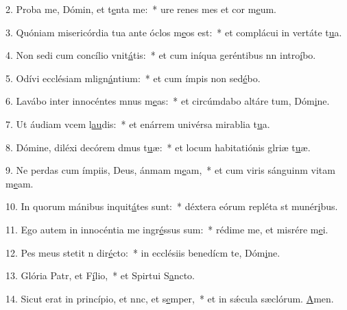 2. Proba me, Dómin, et t\uline{e}nta me:~* ure renes mes et cor m\uline{e}um.\par 
3. Quóniam misericórdia tua ante óclos m\uline{e}os est:~* et complácui in vertáte t\uline{u}a.\par 
4. Non sedi cum concílio vnit\uline{á}tis:~* et cum iníqua geréntibus nn intro\uline{í}bo.\par 
5. Odívi ecclésiam mlign\uline{á}ntium:~* et cum ímpis non sed\uline{é}bo.\par 
6. Lavábo inter innocéntes mnus m\uline{e}as:~* et circúmdabo altáre tum, Dóm\uline{i}ne.\par 
7. Ut áudiam vcem l\uline{au}dis:~* et enárrem univérsa mirablia t\uline{u}a.\par 
8. Dómine, diléxi decórem dmus t\uline{u}æ:~* et locum habitatiónis glriæ t\uline{u}æ.\par 
9. Ne perdas cum ímpiis, Deus, ánmam m\uline{e}am,~* et cum viris sánguinm vitam m\uline{e}am.\par 
10. In quorum mánibus inquit\uline{á}tes sunt:~* déxtera eórum repléta st munér\uline{i}bus.\par 
11. Ego autem in innocéntia me ingr\uline{é}ssus sum:~* rédime me, et misrére m\uline{e}i.\par 
12. Pes meus stetit n dir\uline{é}cto:~* in ecclésiis benedícm te, Dóm\uline{i}ne.\par 
13. Glória Patr, et F\uline{í}lio,~* et Spirtui S\uline{a}ncto.\par 
14. Sicut erat in princípio, et nnc, et s\uline{e}mper,~* et in sǽcula sæclórum. \uline{A}men.\par 
